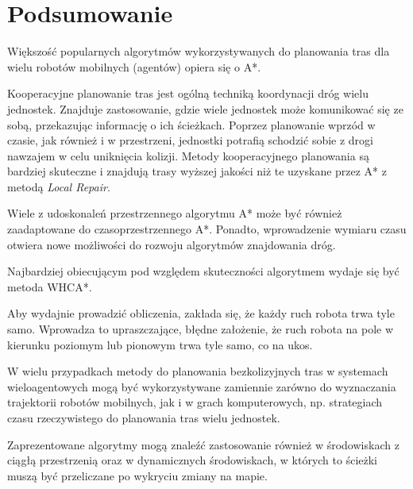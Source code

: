 \chapter{Podsumowanie}
\label{ch:podsumowanie}

Większość popularnych algorytmów wykorzystywanych do planowania tras dla wielu robotów mobilnych (agentów) opiera się o A*.

Kooperacyjne planowanie tras jest ogólną techniką koordynacji dróg wielu jednostek.
Znajduje zastosowanie, gdzie wiele jednostek może komunikować się ze sobą, przekazując informację o ich ścieżkach.
Poprzez planowanie wprzód w czasie, jak również i w przestrzeni, jednostki potrafią schodzić sobie z drogi nawzajem w celu uniknięcia kolizji.
Metody kooperacyjnego planowania są bardziej skuteczne i znajdują trasy wyższej jakości niż te uzyskane przez A* z metodą {\it Local Repair}.

Wiele z udoskonaleń przestrzennego algorytmu A* może być również zaadaptowane do czasoprzestrzennego A*.
Ponadto, wprowadzenie wymiaru czasu otwiera nowe możliwości do rozwoju algorytmów znajdowania dróg.

Najbardziej obiecującym pod względem skuteczności algorytmem wydaje się być metoda WHCA*.

Aby wydajnie prowadzić obliczenia, zakłada się, że każdy ruch robota trwa tyle samo. 
Wprowadza to upraszczające, błędne założenie, że ruch robota na pole w kierunku poziomym lub pionowym trwa tyle samo, co na ukos.

W wielu przypadkach metody do planowania bezkolizyjnych tras w systemach wieloagentowych mogą być wykorzystywane zamiennie zarówno do wyznaczania trajektorii robotów mobilnych, jak i w grach komputerowych, np. strategiach czasu rzeczywistego do planowania tras wielu jednostek.

Zaprezentowane algorytmy mogą znaleźć zastosowanie również w środowiskach z ciągłą przestrzenią oraz w dynamicznych środowiskach, w których to ścieżki muszą być przeliczane po wykryciu zmiany na mapie.
